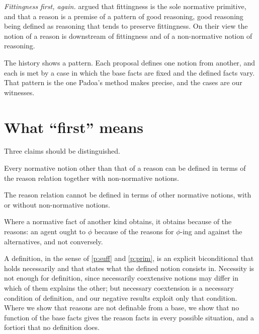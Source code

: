 \documentclass{situationist-preprint}
\begin{document}
\emph{Fittingness first, again.} \citet{Chappell2012} argued that fittingness is the sole normative primitive, and \citet{McHughWay2016} that a reason is a premise of a pattern of good reasoning, good reasoning being defined as reasoning that tends to preserve fittingness. On their view the notion of a reason is downstream of fittingness and of a non-normative notion of reasoning.

The history shows a pattern. Each proposal defines one notion from another, and each is met by a case in which the base facts are fixed and the defined facts vary. That pattern is the one Padoa's method makes precise, and the cases are our witnesses.

\section{What \enquote{first} means}

Three claims should be distinguished.

\begin{principle}[Sufficiency]\label{p:suff}
Every normative notion other than that of a reason can be defined in terms of the reason relation together with non-normative notions.
\end{principle}

\begin{principle}[Primitiveness]\label{p:prim}
The reason relation cannot be defined in terms of other normative notions, with or without non-normative notions.
\end{principle}

\begin{principle}\label{p:expl}
Where a normative fact of another kind obtains, it obtains because of the reasons: an agent ought to $\phi$ because of the reasons for $\phi$-ing and against the alternatives, and not conversely.
\end{principle}

A definition, in the sense of \ref{p:suff} and \ref{p:prim}, is an explicit biconditional that holds necessarily and that states what the defined notion consists in. Necessity is not enough for definition, since necessarily coextensive notions may differ in which of them explains the other; but necessary coextension is a necessary condition of definition, and our negative results exploit only that condition. Where we show that reasons are not definable from a base, we show that no function of the base facts gives the reason facts in every possible situation, and a fortiori that no definition does.
\end{document}
